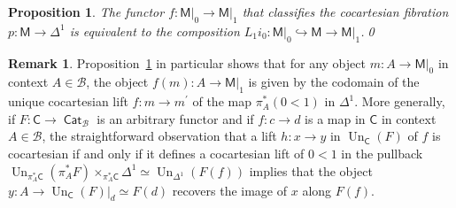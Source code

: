 \documentclass[reqno]{amsart}
\numberwithin{equation}{subsection}
\theoremstyle{plain}
\newtheorem{proposition}[equation]{Proposition}
\theoremstyle{definition}
\newtheorem{remark}[equation]{Remark}
\let\scr=\mathcal
\let\into=\hookrightarrow
\def\BB{\scr B}
\DeclareMathOperator{\ICat}{\mathsf{Cat}}
\DeclareMathOperator{\Un}{Un}
\newcommand{\I}[1]{\mathsf{#1}}
\begin{document}
\begin{proposition}
	\label{prop:StraighteningIntervalExplicitly}
	The functor $f\colon\I{M}\vert_0\to\I{M}\vert_1$ that classifies the cocartesian fibration $p\colon\I{M}\to \Delta^1$ is equivalent to the composition $L_1 i_0\colon\I{M}\vert_0\into\I{M}\to\I{M}\vert_1$.\qed
\end{proposition}
\begin{remark}
	\label{rem:StraighteningIntervalExplicitly}
	Proposition~\ref{prop:StraighteningIntervalExplicitly} in particular shows that for any object $m\colon A\to\I{M}\vert_0$ in context $A\in\BB$, the object $f(m)\colon A\to\I{M}\vert_1$ is given by the codomain of the unique cocartesian lift $f\colon m\to m^\prime$ of the map $\pi_A^\ast(0<1)$ in $\Delta^1$. More generally, if $F\colon\I{C}\to\ICat_{\BB}$ is an arbitrary functor and if $f\colon c\to d$ is a map in $\I{C}$ in context $A\in\BB$, the straightforward observation that a lift $h\colon x\to y$ in $\Un_{\I{C}}(F)$ of $f$ is cocartesian if and only if it defines a cocartesian lift of $0<1$ in the pullback $\Un_{\pi_A^\ast\I{C}}(\pi_A^\ast F)\times_{\pi_A^\ast\I{C}}\Delta^1\simeq\Un_{\Delta^1}(F(f))$ implies that the object $y\colon A\to \Un_{\I{C}}(F)\vert_d\simeq F(d)$ recovers the image of $x$ along $F(f)$.
\end{remark}
\end{document}

